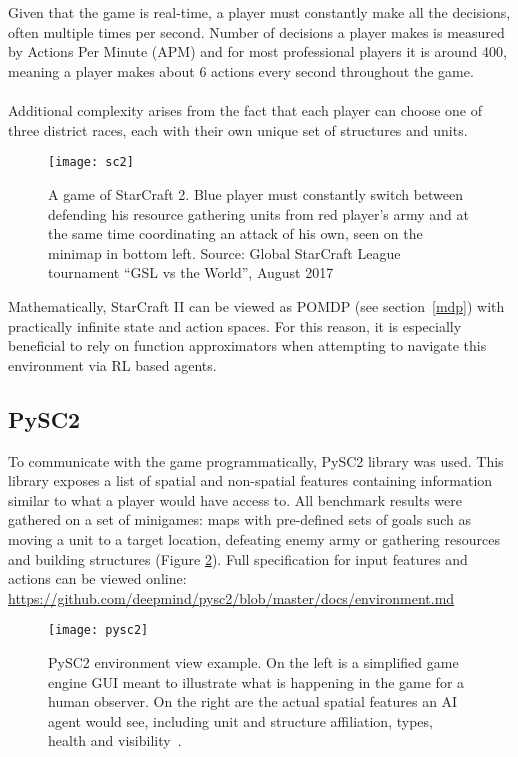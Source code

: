 \\\\
Given that the game is real-time, a player must constantly make all the decisions, often multiple times per second. Number of decisions a player makes is measured by Actions Per Minute (APM) and for most professional players it is around 400, meaning a player makes about 6 actions every second throughout the game.
\\\\
Additional complexity arises from the fact that each player can choose one of three district races, each with their own unique set of structures and units.

\begin{figure}[ht]
\begin{center}
\texttt{[image: sc2]}
\caption{A game of StarCraft 2. Blue player must constantly switch between defending his resource gathering units from red player’s army and at the same time coordinating an attack of his own, seen on the minimap in bottom left. 
Source: Global StarCraft League tournament “GSL vs the World”, August 2017}
\label{fig:sc2}
\end{center}
\end{figure}

\noindent Mathematically, StarCraft II can be viewed as POMDP (see section~\ref{mdp}) with practically infinite state and action spaces.
For this reason, it is especially beneficial to rely on function approximators when attempting to navigate this environment via RL based agents.

\subsection{PySC2}

To communicate with the game programmatically, PySC2 library was used. This library exposes a list of spatial and non-spatial features containing information similar to what a player would have access to. All benchmark results were gathered on a set of minigames: maps with pre-defined sets of goals such as moving a unit to a target location, defeating enemy army or gathering resources and building structures (Figure \ref{fig:pysc2}). Full specification for input features and actions can be viewed online: \url{https://github.com/deepmind/pysc2/blob/master/docs/environment.md}

\begin{figure}[ht]
\begin{center}
\texttt{[image: pysc2]}
\caption{PySC2 environment view example. On the left is a simplified game engine GUI meant to illustrate what is happening in the game for a human observer. On the right are the actual spatial features an AI agent would see, including unit and structure affiliation, types, health and visibility~\cite{Vinyals2017}.}
\label{fig:pysc2}
\end{center}
\end{figure}